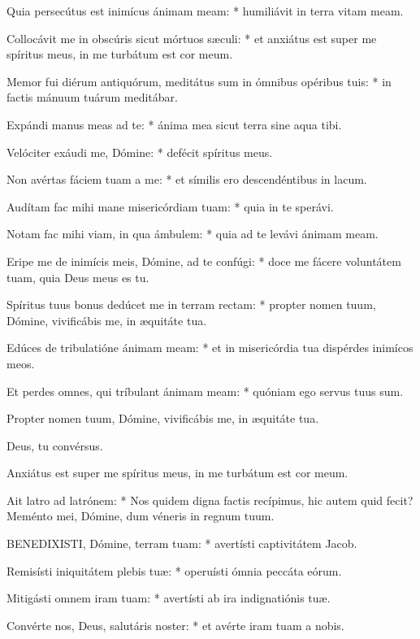 Quia persecútus est inimícus ánimam meam: * humiliávit in terra vitam meam.

Collocávit me in obscúris sicut mórtuos sæculi: * et anxiátus est super me spíritus meus, in me turbátum est cor meum.

Memor fui diérum antiquórum, meditátus sum in ómnibus opéribus tuis: * in factis mánuum tuárum meditábar.

Expándi manus meas ad te: * ánima mea sicut terra sine aqua tibi.

Velóciter exáudi me, Dómine: * defécit spíritus meus.

Non avértas fáciem tuam a me: * et símilis ero descendéntibus in lacum.

Audítam fac mihi mane misericórdiam tuam: * quia in te sperávi.

Notam fac mihi viam, in qua ámbulem: * quia ad te levávi ánimam meam.

Eripe me de inimícis meis, Dómine, ad te confúgi: * doce me fácere voluntátem tuam, quia Deus meus es tu.

Spíritus tuus bonus dedúcet me in terram rectam: * propter nomen tuum, Dómine, vivificábis me, in æquitáte tua.

Edúces de tribulatióne ánimam meam: * et in misericórdia tua dispérdes inimícos meos.

Et perdes omnes, qui tríbulant ánimam meam: * quóniam ego servus tuus sum.

 Propter nomen tuum, Dómine, vivificábis me, in æquitáte tua.

 Deus, tu convérsus.


 Anxiátus est super me spíritus meus, in me turbátum est cor meum.

 Ait latro ad latrónem: * Nos quidem digna factis recípimus, hic autem quid fecit? Meménto mei, Dómine, dum véneris in regnum tuum.


\lettrine[lines=2]{B}{ENEDIXISTI}, Dómine, terram tuam: * avertísti captivitátem Jacob.

Remisísti iniquitátem plebis tuæ: * operuísti ómnia peccáta eórum.

Mitigásti omnem iram tuam: * avertísti ab ira indignatiónis tuæ.

Convérte nos, Deus, salutáris noster: * et avérte iram tuam a nobis.

